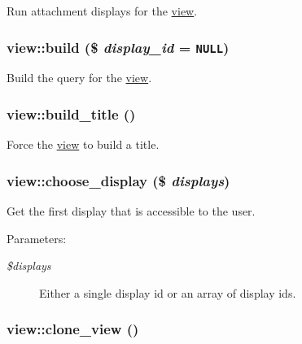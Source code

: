 Run attachment displays for the \hyperlink{classview}{view}. \hypertarget{classview_e6c1bacf2c29c0b2b0f641c4768f2f44}{
\subsubsection[{build}]{\setlength{\rightskip}{0pt plus 5cm}view::build (\$ {\em display\_\-id} = {\tt NULL})}}
\label{classview_e6c1bacf2c29c0b2b0f641c4768f2f44}


Build the query for the \hyperlink{classview}{view}. \hypertarget{classview_15a2dddb480ab44af4a093579a544501}{
\subsubsection[{build\_\-title}]{\setlength{\rightskip}{0pt plus 5cm}view::build\_\-title ()}}
\label{classview_15a2dddb480ab44af4a093579a544501}


Force the \hyperlink{classview}{view} to build a title. \hypertarget{classview_66ba9a9554f6f5fc3e2ee54e448b6f32}{
\subsubsection[{choose\_\-display}]{\setlength{\rightskip}{0pt plus 5cm}view::choose\_\-display (\$ {\em displays})}}
\label{classview_66ba9a9554f6f5fc3e2ee54e448b6f32}


Get the first display that is accessible to the user.

\begin{Desc}
\item[Parameters:]
\begin{description}
\item[{\em \$displays}]Either a single display id or an array of display ids. \end{description}
\end{Desc}
\hypertarget{classview_d9f19580a578b9e05c7f353090668a99}{
\subsubsection[{clone\_\-view}]{\setlength{\rightskip}{0pt plus 5cm}view::clone\_\-view ()}}
\label{classview_d9f19580a578b9e05c7f353090668a99}


